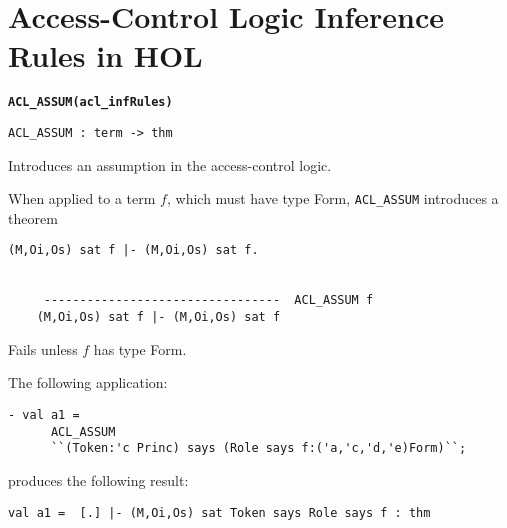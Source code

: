 
\chapter{Access-Control Logic Inference Rules in HOL}
\label{cha:access-control-logic}


\begin{holboxed}
  \begin{Large}
    \texttt{\textbf{ACL\_ASSUM}}\hfill{}\texttt{\textbf{(acl\_infRules)}}    
  \end{Large}
\end{holboxed}

\begin{verbatim}
ACL_ASSUM : term -> thm
\end{verbatim}

\SYNOPSIS
Introduces an assumption in the access-control logic.

\DESCRIBE
When applied to a term $f$, which must have type Form,
\texttt{ACL\_ASSUM} introduces a theorem 
\begin{verbatim}
(M,Oi,Os) sat f |- (M,Oi,Os) sat f.


     ---------------------------------  ACL_ASSUM f
    (M,Oi,Os) sat f |- (M,Oi,Os) sat f
\end{verbatim}

\FAILURE
Fails unless $f$ has type Form.

\EXAMPLE
The following application:
\begin{holboxed}
\begin{verbatim}
- val a1 = 
      ACL_ASSUM 
      ``(Token:'c Princ) says (Role says f:('a,'c,'d,'e)Form)``;
\end{verbatim}
\end{holboxed}
produces the following result:
\begin{holboxed}
\begin{verbatim}
val a1 =  [.] |- (M,Oi,Os) sat Token says Role says f : thm
\end{verbatim}
\end{holboxed}

